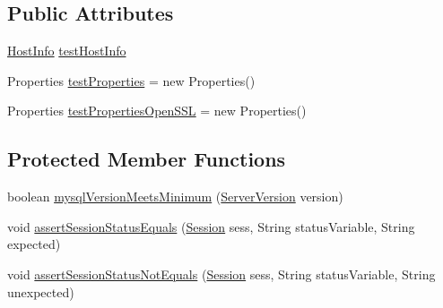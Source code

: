 \subsection*{Public Attributes}
\begin{DoxyCompactItemize}
\item 
\mbox{\hyperlink{classcom_1_1mysql_1_1cj_1_1conf_1_1_host_info}{Host\+Info}} \mbox{\hyperlink{classtestsuite_1_1x_1_1internal_1_1_internal_x_base_test_case_a0f092b9a4e2c943508f9c4c09c185c86}{test\+Host\+Info}}
\item 
Properties \mbox{\hyperlink{classtestsuite_1_1x_1_1internal_1_1_internal_x_base_test_case_a74244485aa21e7d7e8379b046ccc2f55}{test\+Properties}} = new Properties()
\item 
Properties \mbox{\hyperlink{classtestsuite_1_1x_1_1internal_1_1_internal_x_base_test_case_a92fe3eaac36627c36d450017d7337cb2}{test\+Properties\+Open\+S\+SL}} = new Properties()
\end{DoxyCompactItemize}
\subsection*{Protected Member Functions}
\begin{DoxyCompactItemize}
\item 
boolean \mbox{\hyperlink{classtestsuite_1_1x_1_1internal_1_1_internal_x_base_test_case_aef44a0618434c52b5a52a5676bbf73c0}{mysql\+Version\+Meets\+Minimum}} (\mbox{\hyperlink{classcom_1_1mysql_1_1cj_1_1_server_version}{Server\+Version}} version)
\item 
void \mbox{\hyperlink{classtestsuite_1_1x_1_1internal_1_1_internal_x_base_test_case_a2d18783f0ca99200dc1415790f8e50f7}{assert\+Session\+Status\+Equals}} (\mbox{\hyperlink{interfacecom_1_1mysql_1_1cj_1_1xdevapi_1_1_session}{Session}} sess, String status\+Variable, String expected)
\item 
void \mbox{\hyperlink{classtestsuite_1_1x_1_1internal_1_1_internal_x_base_test_case_a2414b3472ecb564edb0f0985be4d7eac}{assert\+Session\+Status\+Not\+Equals}} (\mbox{\hyperlink{interfacecom_1_1mysql_1_1cj_1_1xdevapi_1_1_session}{Session}} sess, String status\+Variable, String unexpected)
\end{DoxyCompactItemize}
